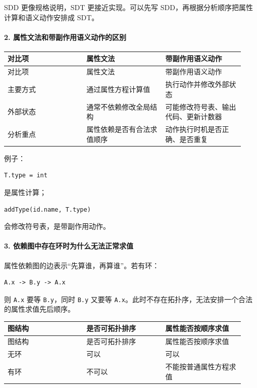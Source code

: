 \documentclass[UTF8]{ctexart}
\begin{document}
SDD 更像规格说明，SDT 更接近实现。可以先写 SDD，再根据分析顺序把属性计算和语义动作安排成 SDT。

\paragraph*{2. 属性文法和带副作用语义动作的区别}

\begin{longtable}{|p{0.31\linewidth}|p{0.31\linewidth}|p{0.31\linewidth}|}
\hline
对比项 & 属性文法 & 带副作用语义动作 \\
\hline
\endfirsthead
对比项 & 属性文法 & 带副作用语义动作 \\
\hline
\endhead
主要方式 & 通过属性方程计算值 & 执行动作并修改外部状态 \\
\hline
外部状态 & 通常不依赖修改全局结构 & 可能修改符号表、输出代码、更新计数器 \\
\hline
分析重点 & 属性依赖是否有合法求值顺序 & 动作执行时机是否正确、是否重复 \\
\hline
\end{longtable}

例子：

\begin{Verbatim}[fontsize=\small,breaklines=true]
T.type = int
\end{Verbatim}

是属性计算；

\begin{Verbatim}[fontsize=\small,breaklines=true]
addType(id.name, T.type)
\end{Verbatim}

会修改符号表，是带副作用动作。

\paragraph*{3. 依赖图中存在环时为什么无法正常求值}

属性依赖图的边表示“先算谁，再算谁”。若有环：

\begin{Verbatim}[fontsize=\small,breaklines=true]
A.x -> B.y -> A.x
\end{Verbatim}

则 \texttt{A.x} 要等 \texttt{B.y}，同时 \texttt{B.y} 又要等 \texttt{A.x}。此时不存在拓扑序，无法安排一个合法的属性求值先后顺序。

\begin{longtable}{|p{0.31\linewidth}|p{0.31\linewidth}|p{0.31\linewidth}|}
\hline
图结构 & 是否可拓扑排序 & 属性能否按顺序求值 \\
\hline
\endfirsthead
图结构 & 是否可拓扑排序 & 属性能否按顺序求值 \\
\hline
\endhead
无环 & 可以 & 可以 \\
\hline
有环 & 不可以 & 不能按普通属性方程求值 \\
\hline
\end{longtable}
\end{document}
